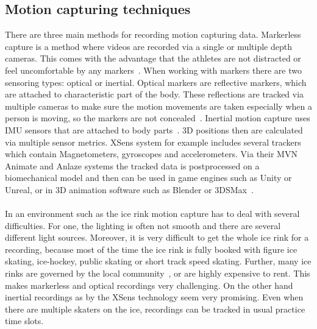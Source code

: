 \subsection{Motion capturing techniques}
There are three main methods for recording motion capturing data.
Markerless capture is a method where videos are recorded via a single or multiple depth cameras.
This comes with the advantage that the athletes are not distracted or feel uncomfortable by any
markers~\cite{mocapopticalradical, mocapopticalcapture, mocapmarkerless3dscans}.
When working with markers there are two sensoring types: optical or inertial.
Optical markers are reflective markers, which are attached to characteristic part of the body.
These reflections are tracked via multiple cameras to make sure the motion movements are taken especially when a
person is moving, so the markers are not concealed~\cite{mocapoptical}.
Inertial motion capture uses IMU sensors that are attached to body parts~\cite{xsens, mocapinterialneuron}.
3D positions then are calculated via multiple sensor metrics.
XSens system for example includes several trackers which contain Magnetometers, gyroscopes and accelerometers.
Via their MVN Animate and Anlaze systems the tracked data is postprocessed on a biomechanical model
and then can be used in game engines such as Unity or Unreal, or in 3D animation software such as Blender or
3DSMax~\cite{xsensabout}.
\\\mbox{}\\
In an environment such as the ice rink motion capture has to deal with several difficulties.
For one, the lighting is often not smooth and there are several different light sources.
Moreover, it is very difficult to get the whole ice rink for a recording, because most of the time the ice rink is fully
booked with figure ice skating, ice-hockey, public skating or short track speed skating.
Further, many ice rinks are governed by the local community~\cite{stuttgarteiswelt}, or are highly expensive to rent.
This makes markerless and optical recordings very challenging.
On the other hand inertial recordings as by the XSens technology seem very promising.
Even when there are multiple skaters on the ice, recordings can be tracked in usual practice time slots.

